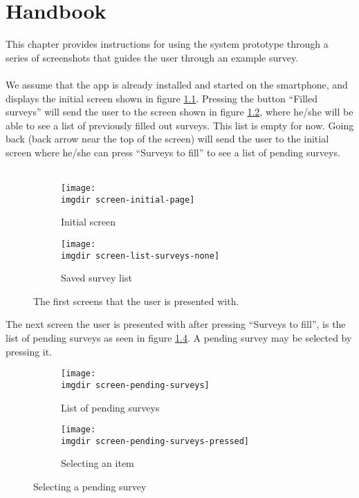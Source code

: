 \chapter{Handbook}
\label{chap:handbook}
This chapter provides instructions for using the system prototype through a series of screenshots that guides the user through an example survey.\\\\
We assume that the app is already installed and started on the smartphone, and displays the initial screen shown in figure \ref{fig:screen-initial-page}. Pressing the button ``Filled surveys'' will send the user to the screen shown in figure \ref{fig:screen-list-surveys-none}, where he/she will be able to see a list of previously filled out surveys. This list is empty for now. Going back (back arrow near the top of the screen) will send the user to the initial screen where he/she can press ``Surveys to fill'' to see a list of pending surveys.\\\\
\begin{figure}[!htbp]
 \centering

 \begin{subfigure}{.3\textwidth}
    \centering
    \texttt{[image: \\imgdir screen-initial-page]}
    \caption{Initial screen}
    \label{fig:screen-initial-page}
  \end{subfigure}
  \begin{subfigure}{.3\textwidth}
    \centering
    \texttt{[image: \\imgdir screen-list-surveys-none]}
    \caption{Saved survey list}
    \label{fig:screen-list-surveys-none}
  \end{subfigure}

  \caption{The first screens that the user is presented with.}
  \label{fig:screen-initial-pages}
\end{figure}

The next screen the user is presented with after pressing ``Surveys to fill'', is the list of pending surveys as seen in figure \ref{fig:screen-pending-surveys}. A pending survey may be selected by pressing it.
\newpage

\begin{figure}[!htbp]
 \centering
 \begin{subfigure}{.3\textwidth}
    \centering
    \texttt{[image: \\imgdir screen-pending-surveys]}
    \caption{List of pending surveys}
    \label{fig:screen-pending-surveys}
  \end{subfigure}
  \begin{subfigure}{.3\textwidth}
    \centering
    \texttt{[image: \\imgdir screen-pending-surveys-pressed]}
    \caption{Selecting an item}
    \label{fig:screen-pending-surveys-pressed}
  \end{subfigure}
  \caption{Selecting a pending survey}
   \label{fig:screens-selecting-pending-survey}
\end{figure}

